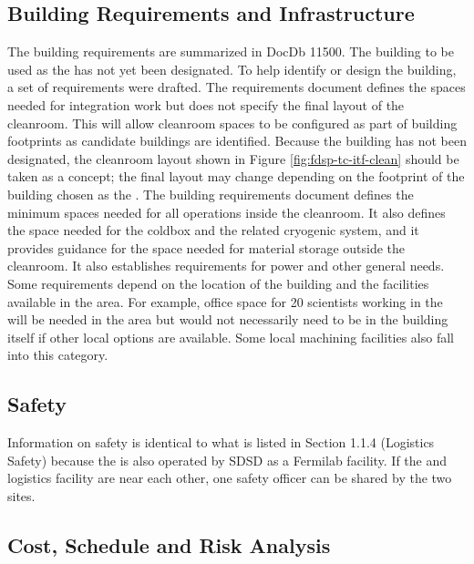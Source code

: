 \subsection{Building Requirements and Infrastructure}
\label{sec:fdsp-tc-itf-req}
The  building requirements are summarized in DocDb 11500.\cite{bib:docdb11500} The building to be used as the  has not yet been designated. To help identify or design the  building, a set of requirements were drafted. The requirements document defines the spaces needed for integration work but does not specify the final layout of the cleanroom. This will allow cleanroom spaces to be configured as part of building footprints as candidate buildings are identified. Because the building has not been designated, the cleanroom layout shown in Figure \ref{fig:fdsp-tc-itf-clean} should be taken as a concept; the final layout may change depending on the footprint of the building chosen as the . The building requirements document\cite{bib:docdb11500}  defines the minimum spaces needed for all operations inside the  cleanroom. It also defines the space needed for the coldbox and the related cryogenic system, and it provides guidance for the space needed for material storage outside the cleanroom. It also establishes requirements for power and other general needs. Some requirements depend on the location of the building and the facilities available in the area. For example, office space for 20 scientists working in the  will be needed in the area but would not necessarily need to be in the  building itself if other local options are available. Some local machining facilities also fall into this category. 

\subsection{Safety}
\label{sec:fdsp-tc-itf-safety}

Information on  safety is identical to what is listed in Section 1.1.4 (Logistics Safety) because the  is also operated by SDSD as a Fermilab facility.    If the  and logistics facility are near each other, one safety officer can be shared by the two sites.    

\subsection{Cost, Schedule and Risk Analysis}
\label{sec:fdsp-tc-itf-cost}

